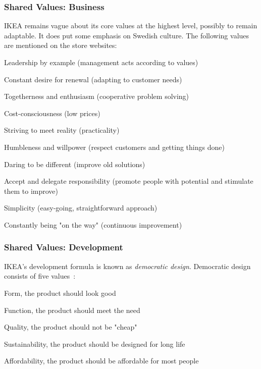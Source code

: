 \subsubsection{Shared Values: Business}
IKEA remains vague about its core values at the highest level, possibly to remain adaptable.
It does put some emphasis on Swedish culture.
The following values are mentioned on the store websites:
\begin{compactitem}
    \item Leadership by example (management acts according to values)
    \item Constant desire for renewal (adapting to customer needs)
    \item Togetherness and enthusiasm (cooperative problem solving)
    \item Cost-consciousness (low prices)
    \item Striving to meet reality (practicality)
    \item Humbleness and willpower (respect customers and getting things done)
    \item Daring to be different (improve old solutions)
    \item Accept and delegate responsibility (promote people with potential and stimulate them to improve)
    \item Simplicity (easy-going, straightforward approach)
    \item Constantly being "on the way" (continuous improvement)
\end{compactitem}

\subsubsection{Shared Values: Development}
IKEA's development formula is known as \emph{democratic design}.
Democratic design consists of five values~\citep{dezeen2015}:
\begin{compactitem}
    \item Form, the product should look good
    \item Function, the product should meet the need
    \item Quality, the product should not be "cheap"
    \item Sustainability, the product should be designed for long life
    \item Affordability, the product should be affordable for most people
\end{compactitem}

